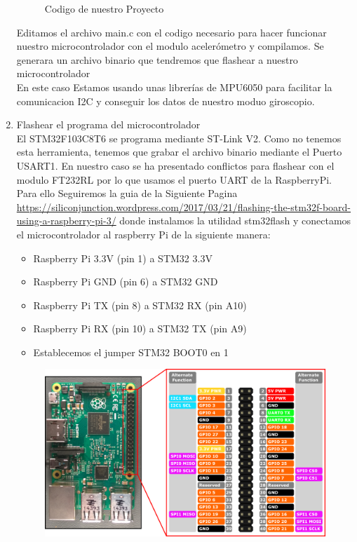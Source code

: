 \documentclass[12pt,oneside,spanish]{article}
\begin{document}
\begin{enumerate}
\begin{figure}[h!]
    \caption{Codigo de nuestro Proyecto}
    \label{fig:my_label}
\end{figure}
Editamos el archivo main.c con el codigo necesario para hacer funcionar nuestro microcontrolador con el modulo acelerómetro y compilamos. Se generara un archivo binario que tendremos que flashear a nuestro microcontrolador
\\
\newpage
En este caso Estamos usando unas librerías de MPU6050 para facilitar la comunicacion I2C y conseguir los datos de nuestro moduo giroscopio.

\item Flashear el programa del microcontrolador\\
El STM32F103C8T6 se programa mediante ST-Link V2. Como no tenemos esta herramienta, tenemos que grabar el archivo binario mediante el Puerto USART1. En nuestro caso se ha presentado conflictos para flashear con el modulo FT232RL por lo que usamos el puerto UART de la RaspberryPi. Para ello Seguiremos la guia de la Siguiente Pagina \url{https://siliconjunction.wordpress.com/2017/03/21/flashing-the-stm32f-board-using-a-raspberry-pi-3/} donde instalamos la utilidad stm32flash y conectamos el microcontrolador al raspberry Pi de la siguiente manera:
\begin{itemize}
    \item Raspberry Pi 3.3V (pin 1) a STM32 3.3V
    \item Raspberry Pi GND (pin 6) a STM32 GND
    \item Raspberry Pi TX (pin 8) a STM32 RX (pin A10)
    \item Raspberry Pi RX (pin 10) a STM32 TX (pin A9)
    \item Establecemos el jumper STM32 BOOT0 en 1
\end{itemize}
\begin{figure}[h!]
    \centering
    \includegraphics[scale=1]{Flash/RP3_pinout.png}

\end{figure}
\end{enumerate}
\end{document}

